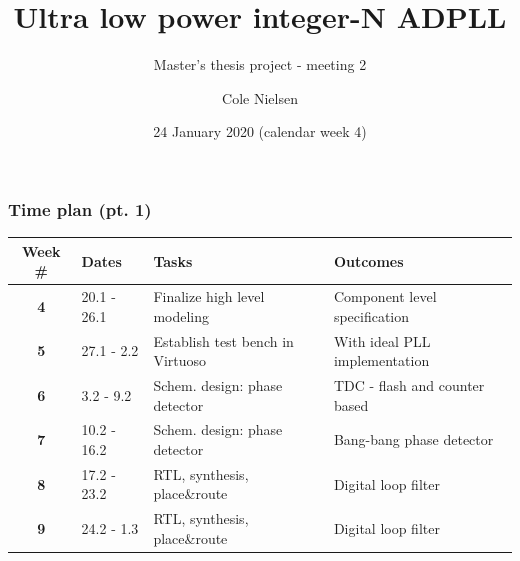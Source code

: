 \documentclass[t, screen, aspectratio=43]{beamer}
\title[Short title]{Ultra low power integer-N ADPLL}
\subtitle{Master's thesis project - meeting 2}
\author[C Nielsen]{Cole Nielsen}
\institute[NTNU]{Department of Electronic Systems, NTNU}
\date{24 January 2020 (calendar week 4)}
\begin{document}
\begin{frame}
	\titlepage%
\end{frame}






\begin{frame}
	\frametitle{Time plan (pt. 1)}
	\begin{table}[htb!]
		\tiny
		\centering
		\vspace{-1em}
		\def\arraystretch{1.5}		
		\setlength\arrayrulewidth{0.75pt}
		\setlength{\tabcolsep}{1em} %
		\begin{tabular}{|c|l|l|l|}
			\hline 
			\rule[-1ex]{0pt}{2.5ex}\cellcolor{gray!40}\textbf{Week \#} & \cellcolor{gray!40}\textbf{Dates} &\cellcolor{gray!40}\textbf{Tasks} & \cellcolor{gray!40}\textbf{Outcomes}\\ 
			\hline 
			\rule[-1ex]{0pt}{2.5ex}\cellcolor{green!40}\textbf{4}&\cellcolor{green!40}20.1 - 26.1 &\cellcolor{green!40}Finalize high level modeling &\cellcolor{green!40}Component level specification\\ 
			\hline 
			\rule[-1ex]{0pt}{2.5ex}\textbf{5}& 27.1 - 2.2 & Establish test bench in Virtuoso & With ideal PLL implementation\\ 
			\hline 
			\rule[-1ex]{0pt}{2.5ex}\textbf{6}& 3.2 - 9.2& Schem. design: phase detector & TDC - flash and counter based \\ 
			\hline 
			\rule[-1ex]{0pt}{2.5ex}\textbf{7}& 10.2 - 16.2& Schem. design: phase detector & Bang-bang phase detector\\ 
			\hline 
			\rule[-1ex]{0pt}{2.5ex}\textbf{8}&17.2 - 23.2& RTL, synthesis, place\&route & Digital loop filter\\ 
			\hline 
			\rule[-1ex]{0pt}{2.5ex}\textbf{9}&24.2 - 1.3& RTL, synthesis, place\&route & Digital loop filter\\ 

\end{tabular}
\end{table}
\end{frame}
\end{document}
